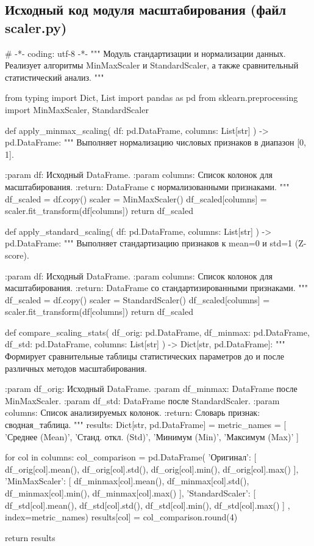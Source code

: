 \documentclass[14pt,a4paper]{extarticle}
\begin{document}
\subsection{Исходный код модуля масштабирования (файл scaler.py)}
\begin{CodeListing}
# -*- coding: utf-8 -*-
"""
Модуль стандартизации и нормализации данных.
Реализует алгоритмы MinMaxScaler и StandardScaler,
а также сравнительный статистический анализ.
"""

from typing import Dict, List
import pandas as pd
from sklearn.preprocessing import MinMaxScaler, StandardScaler


def apply_minmax_scaling(
    df: pd.DataFrame, columns: List[str]
) -> pd.DataFrame:
    """
    Выполняет нормализацию числовых признаков в диапазон [0, 1].

    :param df: Исходный DataFrame.
    :param columns: Список колонок для масштабирования.
    :return: DataFrame с нормализованными признаками.
    """
    df_scaled = df.copy()
    scaler = MinMaxScaler()
    df_scaled[columns] = scaler.fit_transform(df[columns])
    return df_scaled


def apply_standard_scaling(
    df: pd.DataFrame, columns: List[str]
) -> pd.DataFrame:
    """
    Выполняет стандартизацию признаков к mean=0 и std=1 (Z-score).

    :param df: Исходный DataFrame.
    :param columns: Список колонок для масштабирования.
    :return: DataFrame со стандартизированными признаками.
    """
    df_scaled = df.copy()
    scaler = StandardScaler()
    df_scaled[columns] = scaler.fit_transform(df[columns])
    return df_scaled


def compare_scaling_stats(
    df_orig: pd.DataFrame,
    df_minmax: pd.DataFrame,
    df_std: pd.DataFrame,
    columns: List[str]
) -> Dict[str, pd.DataFrame]:
    """
    Формирует сравнительные таблицы статистических параметров
    до и после различных методов масштабирования.

    :param df_orig: Исходный DataFrame.
    :param df_minmax: DataFrame после MinMaxScaler.
    :param df_std: DataFrame после StandardScaler.
    :param columns: Список анализируемых колонок.
    :return: Словарь {признак: сводная_таблица}.
    """
    results: Dict[str, pd.DataFrame] = {}
    metric_names = [
        'Среднее (Mean)', 'Станд. откл. (Std)',
        'Минимум (Min)', 'Максимум (Max)'
    ]

    for col in columns:
        col_comparison = pd.DataFrame({
            'Оригинал': [
                df_orig[col].mean(), df_orig[col].std(),
                df_orig[col].min(), df_orig[col].max()
            ],
            'MinMaxScaler': [
                df_minmax[col].mean(), df_minmax[col].std(),
                df_minmax[col].min(), df_minmax[col].max()
            ],
            'StandardScaler': [
                df_std[col].mean(), df_std[col].std(),
                df_std[col].min(), df_std[col].max()
            ]
        }, index=metric_names)
        results[col] = col_comparison.round(4)

    return results\end{CodeListing}
\end{document}
